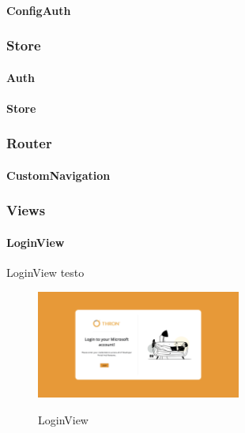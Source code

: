 \paragraph{ConfigAuth}\label{par:config-auth}

\subsubsection{Store}\label{subsubsec:store}
\paragraph{Auth}\label{par:auth-store}
\paragraph{Store}\label{par:store}

\subsubsection{Router}\label{subsubsec:router}
\paragraph{CustomNavigation}\label{par:custom-navigation}


\subsubsection{Views}\label{subsubsec:views}

\paragraph{LoginView}\label{par:ogin-view}

LoginView testo

\begin{figure}[ht]
  \centering
  \includegraphics[width=0.6\textwidth, alt={Pagina di login dell'applicazione}]{images/frontend/LoginView.jpg}
  \caption{LoginView}\label{fig:login-view}
\end{figure}

